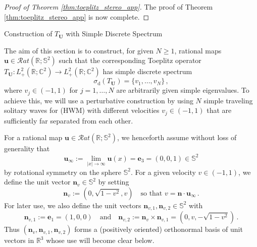 \documentclass[11pt,reqno]{amsart}
\makeatletter
\theoremstyle{definition}
\theoremstyle{remark}
\theoremstyle{remark}
\numberwithin{equation}{section}
\newcommand{\C}{\mathbb{C}}
\newcommand{\R}{\mathbb{R}}
\newcommand{\Ss}{\mathbb{S}}
\newcommand{\nv}{\mathbf{n}}
\newcommand{\be}{\begin{equation}}
\newcommand{\ee}{\end{equation}}
\newcommand{\uu}{\mathbf{u}}
\newcommand{\Ub}{\mathbf{U}}
\def\section{\@startsection{section}{1}%
  \z@{1.5\linespacing\@plus\linespacing}{.5\linespacing}%
  {\normalfont\bfseries\large\centering}}
\makeatother
\begin{document}
\begin{appendix}
\begin{proof}[Proof of Theorem \ref{thm:toeplitz_stereo_app}]
The proof of Theorem \ref{thm:toeplitz_stereo_app} is now complete.
\end{proof}


\section{Construction of $T_\Ub$ with Simple Discrete Spectrum}

\label{app:perturbation}

The aim of this section is to construct, for given $N \geq 1$, rational maps $\uu \in \mathcal{R}at(\R; \Ss^2)$ such that the corresponding Toeplitz operator $T_{\Ub} : L^2_+(\R; \C^2) \to L^2_+(\R; \C^2)$ has simple discrete spectrum 
$$
\sigma_{\mathrm{d}}(T_\Ub) = \{ v_1, \ldots, v_N \} \, ,
$$
where $v_j \in (-1, 1)$ for $j=1, \ldots, N$ are arbitrarily given simple eigenvalues. To achieve this, we will use a perturbative construction by using $N$ simple traveling solitary waves for (HWM) with different velocities $v_j \in (-1,1)$ that are sufficiently far separated from each other. 

For a rational map $\uu \in \mathcal{R}at(\R; \Ss^2)$,  we henceforth assume without loss of generality that
$$
\uu_\infty := \lim_{|x| \to \infty} \uu(x) =  \mathbf{e}_3=(0,0,1) \in \Ss^2
$$ 
by rotational symmetry on the sphere $\Ss^2$. For a given velocity $v \in (-1,1)$, we define the unit vector $\nv_v \in \Ss^2$ by setting
\be \label{eq:nv}
\nv_v := (0,\sqrt{1-v^2}, v )  \quad \mbox{so that $v = \nv \cdot \uu_\infty$} \, .
\ee
For later use, we also define the unit vectors $\nv_{v,1}, \nv_{v,2} \in \Ss^2$ with
\be \label{eq:nv2}
\nv_{v,1} := \mathbf{e}_1 = (1,0,0) \quad \mbox{and} \quad \nv_{v,2} := \nv_v \times \nv_{v,1} = (0,v, -\sqrt{1-v^2}) \, .
\ee
Thus $(\nv_v, \nv_{v,1}, \nv_{v,2})$ forms a (positively oriented) orthonormal basis of unit vectors in $\R^3$ whose use will become clear below.


\end{appendix}
\end{document}
